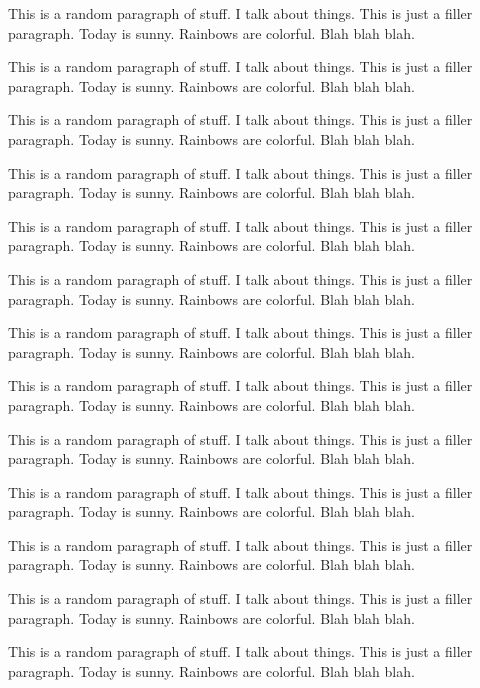 \documentclass{article}
\begin{document}
		{\color{BurntOrange} This is a random paragraph of stuff. I talk about things. This is just a filler paragraph. Today is sunny. Rainbows are colorful. Blah blah blah.}
		
		{\color{BurntOrange} This is a random paragraph of stuff. I talk about things. This is just a filler paragraph. Today is sunny. Rainbows are colorful. Blah blah blah.}
		
		{\color{BurntOrange} This is a random paragraph of stuff. I talk about things. This is just a filler paragraph. Today is sunny. Rainbows are colorful. Blah blah blah.}
		
		{\color{BurntOrange} This is a random paragraph of stuff. I talk about things. This is just a filler paragraph. Today is sunny. Rainbows are colorful. Blah blah blah.}
		
		{\color{BurntOrange} This is a random paragraph of stuff. I talk about things. This is just a filler paragraph. Today is sunny. Rainbows are colorful. Blah blah blah.}
		
		{\color{BurntOrange} This is a random paragraph of stuff. I talk about things. This is just a filler paragraph. Today is sunny. Rainbows are colorful. Blah blah blah.}
		
		{\color{BurntOrange} This is a random paragraph of stuff. I talk about things. This is just a filler paragraph. Today is sunny. Rainbows are colorful. Blah blah blah.}
		
		{\color{BurntOrange} This is a random paragraph of stuff. I talk about things. This is just a filler paragraph. Today is sunny. Rainbows are colorful. Blah blah blah.}
		
		{\color{BurntOrange} This is a random paragraph of stuff. I talk about things. This is just a filler paragraph. Today is sunny. Rainbows are colorful. Blah blah blah.}
		
		{\color{BurntOrange} This is a random paragraph of stuff. I talk about things. This is just a filler paragraph. Today is sunny. Rainbows are colorful. Blah blah blah.}
		
		{\color{BurntOrange} This is a random paragraph of stuff. I talk about things. This is just a filler paragraph. Today is sunny. Rainbows are colorful. Blah blah blah.}
		
		{\color{BurntOrange} This is a random paragraph of stuff. I talk about things. This is just a filler paragraph. Today is sunny. Rainbows are colorful. Blah blah blah.}
		
		{\color{BurntOrange} This is a random paragraph of stuff. I talk about things. This is just a filler paragraph. Today is sunny. Rainbows are colorful. Blah blah blah.}
		
\end{document}
